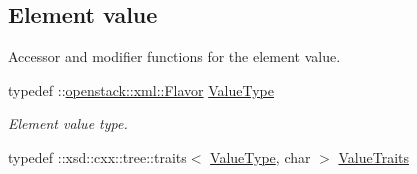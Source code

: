 \subsection*{Element value}
\label{_amgrp2ee2eae1a8c390ea033f241c027da8d6}
Accessor and modifier functions for the element value. \begin{DoxyCompactItemize}
\item 
\hypertarget{classopenstack_1_1xml_1_1Flavor___aaee340bcc1942fe24c4c14686cd8c6ba}{
typedef ::\hyperlink{classopenstack_1_1xml_1_1Flavor}{openstack::xml::Flavor} \hyperlink{classopenstack_1_1xml_1_1Flavor___aaee340bcc1942fe24c4c14686cd8c6ba}{ValueType}}
\label{classopenstack_1_1xml_1_1Flavor___aaee340bcc1942fe24c4c14686cd8c6ba}

\begin{DoxyCompactList}\small\item\em Element value type. \item\end{DoxyCompactList}\item 
\hypertarget{classopenstack_1_1xml_1_1Flavor___ad0acf8e34d3d4cca6587d495999ca67b}{
typedef ::xsd::cxx::tree::traits$<$ \hyperlink{classopenstack_1_1xml_1_1Flavor}{ValueType}, char $>$ \hyperlink{classopenstack_1_1xml_1_1Flavor___ad0acf8e34d3d4cca6587d495999ca67b}{ValueTraits}}
\label{classopenstack_1_1xml_1_1Flavor___ad0acf8e34d3d4cca6587d495999ca67b}


\end{DoxyCompactItemize}
